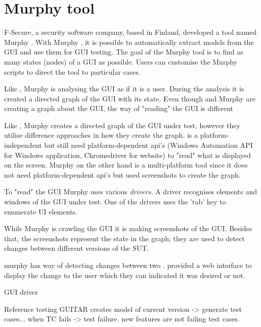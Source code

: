 
















\section{Murphy tool} \label{sec:murphy-tool}
F-Secure, a security software company, based in Finland, developed a tool named Murphy \cite{aho2013industrial}. With Murphy , it is possible to automatically extract models from the GUI and use them for GUI testing. The goal of the Murphy tool is to find as many states (nodes) of a GUI as possible. Users can customise the Murphy scripts to direct the tool to particular cases. 

Like \testar, Murphy is analysing the GUI as if it is a user. During the analysis it is created a directed graph of the GUI with its state. Even though \testar and Murphy are creating a graph about the GUI, the way of "reading" the GUI is different 

Like \testar, Murphy creates a directed graph of the GUI under test, however they utilise difference approaches in how they create the graph. \testar is a platform-independent but still need platform-dependent api's (Windows Automation API for Windows application, Chromedriver for website) to "read" what is displayed on the screen. Murphy on the other hand is a multi-platform tool since it does not need platform-dependent api's but used screenshots to create the graph. \cite{aho2013industrial}

To "read" the GUI Murphy uses various \emph{drivers}.  A driver recognises elements and windows of the GUI under test. One of the drivers uses the 'tab' key to enumerate UI elements. 

While Murphy is crawling the GUI it is making screenshots of the GUI. Besides that, the screenshots represent the state in the graph; they are used to detect changes between different versions of the SUT. 

murphy has way of detecting changes between two .
provided a web interface to display the change to the user which they can indicated it was desired or not. 
 



GUI driver 

Reference testing GUITAR creates model of current version -> generate test cases... when TC fails -> test failure. 
new features are not failing test cases. 


